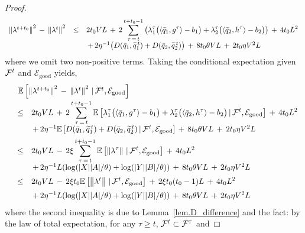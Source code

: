 \documentclass[12pt, final]{l4dc2023}
\begin{document}
\begin{proof}
	\[
	\begin{array}{rcl}
	\left\|{\lambda^{t+t_0}}\right\|^2 \,-\, \left\|{\lambda^{t}}\right\|^2
	& \leq & \displaystyle 2t_0VL
	\,+\,2\sum_{\tau\,=\,t}^{t+t_0-1} 
	\left(
	\lambda_1^{\tau} \big(\langle{ \bar q_1},{g^{\tau}}\rangle - b_1\big)
	+
	\lambda_2^{\tau} \big( \langle{ \bar q_2},{h^{\tau}}\rangle - b_2\big)
	\right)
	\,+\,4t_0L^2
	\\[0.2cm]
	&& \,+\, 2\eta^{-1} \big(D(\bar q_1,\widetilde q_1^{\,t}) + D( \bar q_2, \widetilde q_2^{\,t}) \big)
	\,+\,8t_0\theta V L\,+\,2t_0\eta V^2 L
	\end{array}
	\]
	where we omit two non-positive terms.
	Taking the conditional expectation given ${\mathcal{F}}^{t}$ and $\mathcal{E}_{\text{good}}$ yields,
	\begin{equation}\label{eq.pushback_slater_s}
	\begin{array}{rcl}
	&& \!\!\!\! \!\!\!\! \!\! 
	\mathbb{E} \sbr{ \norm{\lambda^{t+t_0}}^2 \,-\, \norm{\lambda^{t}}^2 \,\vert\, \calF^{t}, \mathcal{E}_{\text{good}}}
	\\[0.2cm]
	& \leq & \displaystyle 2t_0VL
	\,+\, 2 \sum_{\tau\,=\,t}^{t+t_0-1} 
	\mathbb{E} \sbr{ \lambda_1^{\tau} \big(\langle{ \bar q_1},{g^{\tau}}\rangle 
		-b_1\big) +  \lambda_2^{\tau} \big( \langle{ \bar q_2},{h^{\tau}}\rangle - b_2 \big) \,\vert\, \calF^{t}, \mathcal{E}_{\text{good}}}	\,+\,4t_0L^2
	\\[0.2cm]
	&& \,+\, 2\eta^{-1} \mathbb{E} \sbr{ D(\bar q_1,\tilde q_1^{\,t}) + D( \bar q_2, \tilde q_2^{\,t}) \,\vert\, \calF^{t}, \mathcal{E}_{\text{good}}}
	\,+\,8t_0\theta V L\,+\,2t_0\eta V^2 L
	\\[0.2cm]
	& \leq & \displaystyle 2t_0 VL
	\,-\,2\xi\sum_{\tau\,=\,t}^{t+t_0-1} 
	\mathbb{E}\sbr{ \norm{\lambda^{\tau} } \,\vert\, \calF^{t}, \mathcal{E}_{\text{good}}}
	\,+\,4t_0L^2
	\\[0.2cm]
	&& \,+\, 2\eta^{-1} L(\log(|X||A|/\theta)+\log(|Y||B|/\theta))
	\,+\,8t_0\theta V L\,+\,2t_0\eta V^2 L
	\\[0.2cm]
	& \leq & \displaystyle 2t_0 VL
	\,-\,2\xi t_0 \mathbb{E}\sbr{  \norm{\lambda^t} \,\vert\, \calF^{t}, \mathcal{E}_{\text{good}}} 
	\,+\,2 \xi t_0(t_0-1)L
	\,+\,4t_0L^2
	\\[0.2cm]
	&& \,+\, 2\eta^{-1} L(\log(|X||A|/\theta)+\log(|Y||B|/\theta))
	\,+\,8t_0\theta V L\,+\,2t_0\eta V^2 L
	\end{array}
	\end{equation}
	where the second inequality is due to Lemma~\ref{lem.D_difference} and the fact: by the law of total expectation, for any $\tau\geq t$, ${\mathcal{F}}^{t}\subset{\mathcal{F}}^\tau$ and

\end{proof}
\end{document}
